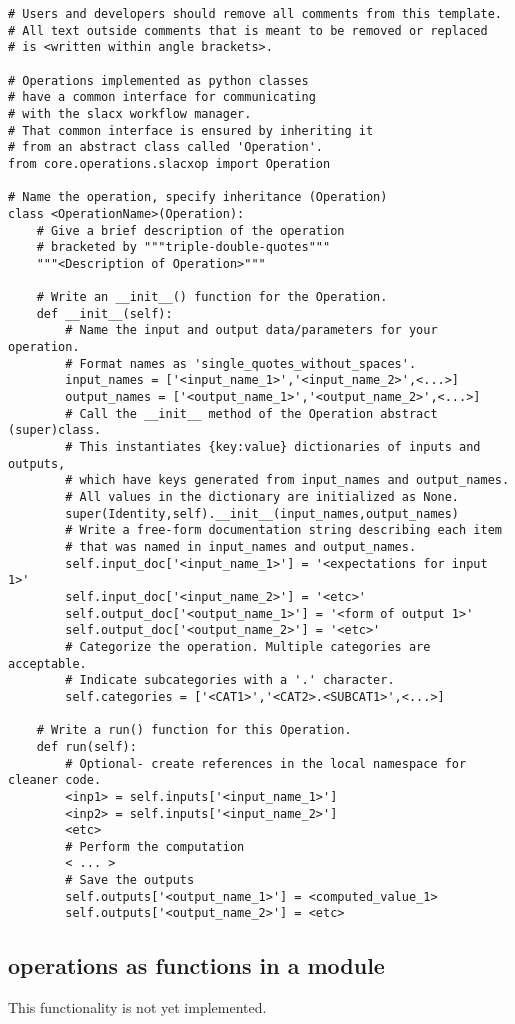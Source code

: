 \begin{lstlisting}
# Users and developers should remove all comments from this template.
# All text outside comments that is meant to be removed or replaced 
# is <written within angle brackets>.

# Operations implemented as python classes 
# have a common interface for communicating 
# with the slacx workflow manager.
# That common interface is ensured by inheriting it
# from an abstract class called 'Operation'.
from core.operations.slacxop import Operation

# Name the operation, specify inheritance (Operation)
class <OperationName>(Operation):
    # Give a brief description of the operation
    # bracketed by """triple-double-quotes"""
    """<Description of Operation>"""

    # Write an __init__() function for the Operation.
    def __init__(self):
        # Name the input and output data/parameters for your operation.
        # Format names as 'single_quotes_without_spaces'.
        input_names = ['<input_name_1>','<input_name_2>',<...>]
        output_names = ['<output_name_1>','<output_name_2>',<...>]
        # Call the __init__ method of the Operation abstract (super)class.
        # This instantiates {key:value} dictionaries of inputs and outputs, 
        # which have keys generated from input_names and output_names.
        # All values in the dictionary are initialized as None. 
        super(Identity,self).__init__(input_names,output_names)
        # Write a free-form documentation string describing each item
        # that was named in input_names and output_names.
        self.input_doc['<input_name_1>'] = '<expectations for input 1>'
        self.input_doc['<input_name_2>'] = '<etc>'
        self.output_doc['<output_name_1>'] = '<form of output 1>'
        self.output_doc['<output_name_2>'] = '<etc>'
        # Categorize the operation. Multiple categories are acceptable.
        # Indicate subcategories with a '.' character.
        self.categories = ['<CAT1>','<CAT2>.<SUBCAT1>',<...>]
        
    # Write a run() function for this Operation.
    def run(self):
        # Optional- create references in the local namespace for cleaner code.
        <inp1> = self.inputs['<input_name_1>']
        <inp2> = self.inputs['<input_name_2>']
        <etc>
        # Perform the computation
        < ... >
        # Save the outputs
        self.outputs['<output_name_1>'] = <computed_value_1>
        self.outputs['<output_name_2>'] = <etc>
\end{lstlisting}


\subsection{operations as functions in a module}
\label{sec:op_dev_by_function}

This functionality is not yet implemented.

